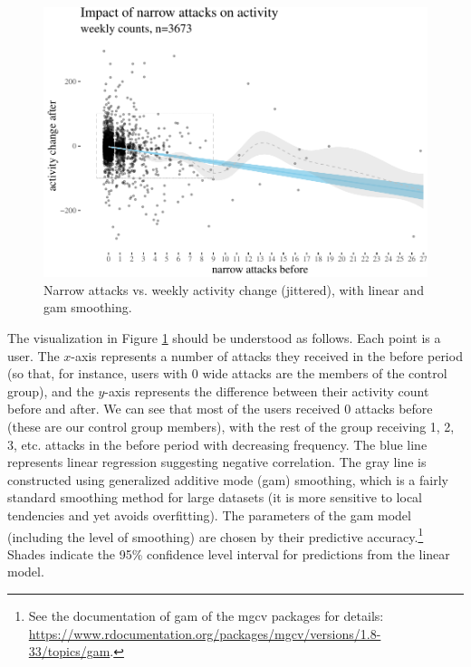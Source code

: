 \documentclass[10pt,dvipsnames]{scrartcl}
\begin{document}
\footnotesize

\normalsize

\begin{figure}

\begin{center}\includegraphics[width=0.85\linewidth]{quittingShortAbridgedRevisions2_files/figure-latex/unnamed-chunk-3-1} \end{center}
\caption{Narrow attacks vs. weekly activity change (jittered), with  linear and gam smoothing.}
\label{fig:highPlots}
\end{figure}

The visualization in Figure \ref{fig:highPlots} should be understood as
follows. Each point is a user. The \(x\)-axis represents a number of
attacks they received in the \textsf{before} period (so that, for
instance, users with 0 wide attacks are the members of the control
group), and the \(y\)-axis represents the difference between their
activity count \textsf{before} and \textsf{after}. We can see that most
of the users received 0 attacks before (these are our control group
members), with the rest of the group receiving 1, 2, 3, etc. attacks in
the \textsf{before} period with decreasing frequency. The blue line
represents linear regression suggesting negative correlation. The gray
line is constructed using generalized additive mode (gam) smoothing,
which is a fairly standard smoothing method for large datasets (it is
more sensitive to local tendencies and yet avoids overfitting). The
parameters of the gam model (including the level of smoothing) are
chosen by their predictive
accuracy.\footnote{See  the documentation of \textsf{gam} of the \textsf{mgcv} packages for details: \url{https://www.rdocumentation.org/packages/mgcv/versions/1.8-33/topics/gam}.}
Shades indicate the 95\% confidence level interval for predictions from
the linear model.
\end{document}
